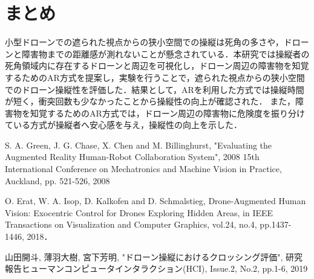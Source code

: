 \documentclass[a4paper,10pt,twocolumn,upLatex]{jsarticle}
\begin{document}
\section{まとめ}
小型ドローンでの遮られた視点からの狭小空間での操縦は死角の多さや，ドローンと障害物までの距離感が測れないことが懸念されている．本研究では操縦者の死角領域内に存在するドローンと周辺を可視化し，ドローン周辺の障害物を知覚するためのAR方式を提案し，実験を行うことで，遮られた視点からの狭小空間でのドローン操縦性を評価した．結果として，ARを利用した方式では操縦時間が短く，衝突回数も少なかったことから操縦性の向上が確認された．
また，障害物を知覚するためのAR方式では，ドローン周辺の障害物に危険度を振り分けている方式が操縦者へ安心感を与え，操縦性の向上を示した．

{\footnotesize 
\begin{thebibliography}{99}
S. A. Green, J. G. Chase, X. Chen and M. Billinghurst, "Evaluating the Augmented Reality Human-Robot Collaboration System", 2008 15th International Conference on Mechatronics and Machine Vision in Practice, Auckland, pp. 521-526, 2008

O. Erat, W. A. Isop, D. Kalkofen and D. Schmalstieg, Drone-Augmented Human Vision: Exocentric Control for Drones Exploring Hidden Areas, in IEEE Transactions on Visualization and Computer Graphics, vol.24, no.4, pp.1437-1446, 2018．

山田開斗, 薄羽大樹, 宮下芳明, "ドローン操縦におけるクロッシング評価", 研究報告ヒューマンコンピュータインタラクション(HCI), Issue.2, No.2, pp.1-6, 2019

\end{thebibliography}
}
\end{document}
